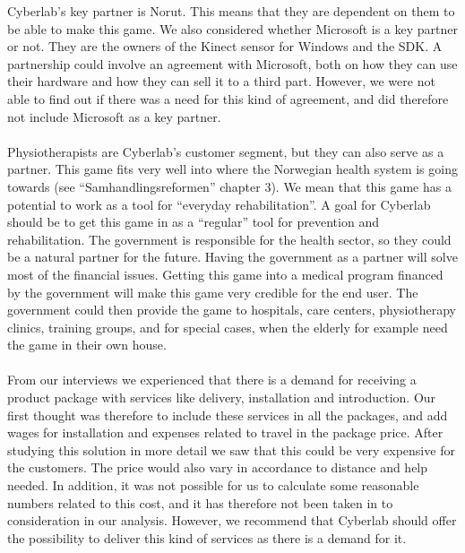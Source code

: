 Cyberlab’s key partner is Norut. This means that they are dependent on them to be able to make this game. We also considered whether Microsoft is a key partner or not. They are the owners of the Kinect sensor for Windows and the SDK. A partnership could involve an agreement with Microsoft, both on how they can use their hardware and how they can sell it to a third part. However, we were not able to find out if there was a need for this kind of agreement, and did therefore not include Microsoft as a key partner. \\ \\
Physiotherapists are Cyberlab's customer segment, but they can also serve as a partner. This game fits very well into where the Norwegian health system is going towards (see “Samhandlingsreformen” chapter 3). We mean that this game has a potential to work as a tool for “everyday rehabilitation”. A goal for Cyberlab should be to get this game in as a “regular” tool for prevention and rehabilitation. The government is responsible for the health sector, so they could be a natural partner for the future. Having the government as a partner will solve most of the financial issues. Getting this game into a medical program financed by the government will make this game very credible for the end user. The government could then provide the game to hospitals, care centers, physiotherapy clinics, training groups, and for special cases, when the elderly for example need the game in their own house. \\ \\ 
From our interviews we experienced that there is a demand for receiving a product package with services like delivery, installation and introduction. Our first thought was therefore to include these services in all the packages, and add wages for installation and expenses related to travel in the package price. After studying this solution in more detail we saw that this could be very expensive for the customers. The price would also vary in accordance to distance and help needed. In addition, it was not possible for us to calculate some reasonable numbers related to this cost, and it has therefore not been taken in to consideration in our analysis. However, we recommend that Cyberlab should offer the possibility to deliver this kind of services as there is a demand for it. \\ \\   
